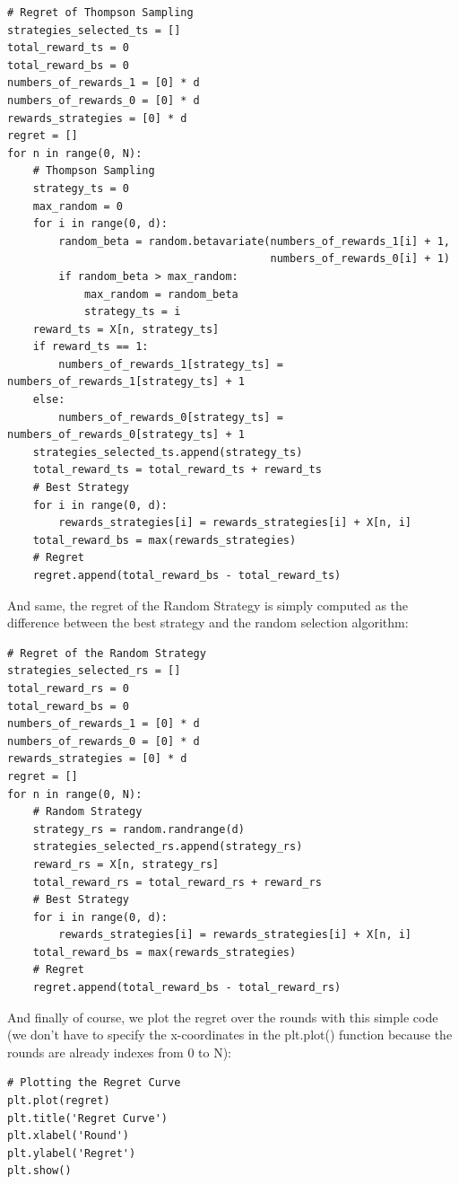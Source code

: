\documentclass[]{book}
\begin{document}
\begin{lstlisting}
# Regret of Thompson Sampling
strategies_selected_ts = []
total_reward_ts = 0
total_reward_bs = 0
numbers_of_rewards_1 = [0] * d
numbers_of_rewards_0 = [0] * d
rewards_strategies = [0] * d
regret = []
for n in range(0, N):
    # Thompson Sampling
    strategy_ts = 0
    max_random = 0
    for i in range(0, d):
        random_beta = random.betavariate(numbers_of_rewards_1[i] + 1,
                                         numbers_of_rewards_0[i] + 1)
        if random_beta > max_random:
            max_random = random_beta
            strategy_ts = i
    reward_ts = X[n, strategy_ts]
    if reward_ts == 1:
        numbers_of_rewards_1[strategy_ts] = numbers_of_rewards_1[strategy_ts] + 1
    else:
        numbers_of_rewards_0[strategy_ts] = numbers_of_rewards_0[strategy_ts] + 1
    strategies_selected_ts.append(strategy_ts)
    total_reward_ts = total_reward_ts + reward_ts
    # Best Strategy
    for i in range(0, d):
        rewards_strategies[i] = rewards_strategies[i] + X[n, i]
    total_reward_bs = max(rewards_strategies)
    # Regret
    regret.append(total_reward_bs - total_reward_ts)
\end{lstlisting}

And same, the regret of the Random Strategy is simply computed as the difference between the best strategy and the random selection algorithm:

\begin{lstlisting}
# Regret of the Random Strategy
strategies_selected_rs = []
total_reward_rs = 0
total_reward_bs = 0
numbers_of_rewards_1 = [0] * d
numbers_of_rewards_0 = [0] * d
rewards_strategies = [0] * d
regret = []
for n in range(0, N):
    # Random Strategy
    strategy_rs = random.randrange(d)
    strategies_selected_rs.append(strategy_rs)
    reward_rs = X[n, strategy_rs]
    total_reward_rs = total_reward_rs + reward_rs
    # Best Strategy
    for i in range(0, d):
        rewards_strategies[i] = rewards_strategies[i] + X[n, i]
    total_reward_bs = max(rewards_strategies)
    # Regret
    regret.append(total_reward_bs - total_reward_rs)
\end{lstlisting}

And finally of course, we plot the regret over the rounds with this simple code (we don't have to specify the x-coordinates in the plt.plot() function because the rounds are already indexes from 0 to N):

\begin{lstlisting}
# Plotting the Regret Curve
plt.plot(regret)
plt.title('Regret Curve')
plt.xlabel('Round')
plt.ylabel('Regret')
plt.show()
\end{lstlisting}
\end{document}
